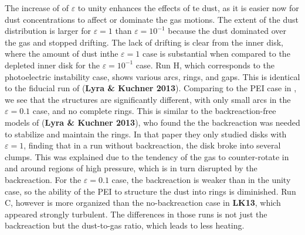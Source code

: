 \documentclass[onecolumn]{report}
\newcommand{\epsi}{\varepsilon}
\begin{document}
The increase of of $\epsi$ to unity enhances the effects of te dust, as it is easier now for dust concentrations to affect or dominate the gas motions. The extent of the dust distribution is larger for $\epsi=1$ than $\epsi=10^{-1}$ because the dust dominated over the gas and stopped drifting. The lack of drifting is clear from the inner disk, where the amount of dust inthe $\epsi=1$ case is substantial when compared to the depleted inner disk for the $\epsi=10^{-1}$ case. Run H, which corresponds to the photoelectric instability case, shows various arcs, rings, and gaps. This is identical to the fiducial run of (\textbf{Lyra \& Kuchner 2013}). Comparing to the PEI case in , we see that the structures are significantly different, with only small arcs in the $\epsi=0.1$ case, and no complete rings. This is similar to the backreaction-free models of (\textbf{Lyra \& Kuchner 2013}), who found the the backreaction was needed to stabilize and maintain the rings. In that paper they only studied disks with $\epsi=1$, finding that in a run without backreaction, the disk broke into several clumps. This was explained due to the tendency of the gas to counter-rotate in and around regions of high pressure, which is in turn disrupted by the backreaction. For the $\epsi=0.1$ case, the backreaction is weaker than in the unity case, so the ability of the PEI to structure the dust into rings is diminished. Run C, however is more organized than the no-backreaction case in
\textbf{LK13}, which appeared strongly turbulent. The differences in those runs is not just the backreaction but the dust-to-gas ratio, which leads to less heating.
\end{document}

